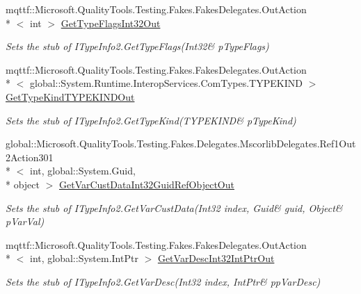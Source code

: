 \begin{DoxyCompactItemize}
mqttf\-::\-Microsoft.\-Quality\-Tools.\-Testing.\-Fakes.\-Fakes\-Delegates.\-Out\-Action\\*
$<$ int $>$ \hyperlink{class_system_1_1_runtime_1_1_interop_services_1_1_com_types_1_1_fakes_1_1_stub_i_type_info2_ac2f6fe3a6957288b95e38b7170801c12}{Get\-Type\-Flags\-Int32\-Out}
\begin{DoxyCompactList}\small\item\em Sets the stub of I\-Type\-Info2.\-Get\-Type\-Flags(Int32\& p\-Type\-Flags)\end{DoxyCompactList}\item 
mqttf\-::\-Microsoft.\-Quality\-Tools.\-Testing.\-Fakes.\-Fakes\-Delegates.\-Out\-Action\\*
$<$ global\-::\-System.\-Runtime.\-Interop\-Services.\-Com\-Types.\-T\-Y\-P\-E\-K\-I\-N\-D $>$ \hyperlink{class_system_1_1_runtime_1_1_interop_services_1_1_com_types_1_1_fakes_1_1_stub_i_type_info2_a641901054dca19f4d4f7ed13ba677e28}{Get\-Type\-Kind\-T\-Y\-P\-E\-K\-I\-N\-D\-Out}
\begin{DoxyCompactList}\small\item\em Sets the stub of I\-Type\-Info2.\-Get\-Type\-Kind(T\-Y\-P\-E\-K\-I\-N\-D\& p\-Type\-Kind)\end{DoxyCompactList}\item 
global\-::\-Microsoft.\-Quality\-Tools.\-Testing.\-Fakes.\-Delegates.\-Mscorlib\-Delegates.\-Ref1\-Out2\-Action301\\*
$<$ int, global\-::\-System.\-Guid, \\*
object $>$ \hyperlink{class_system_1_1_runtime_1_1_interop_services_1_1_com_types_1_1_fakes_1_1_stub_i_type_info2_a5bc85c9686d7564ef6a133789c8ff995}{Get\-Var\-Cust\-Data\-Int32\-Guid\-Ref\-Object\-Out}
\begin{DoxyCompactList}\small\item\em Sets the stub of I\-Type\-Info2.\-Get\-Var\-Cust\-Data(Int32 index, Guid\& guid, Object\& p\-Var\-Val)\end{DoxyCompactList}\item 
mqttf\-::\-Microsoft.\-Quality\-Tools.\-Testing.\-Fakes.\-Fakes\-Delegates.\-Out\-Action\\*
$<$ int, global\-::\-System.\-Int\-Ptr $>$ \hyperlink{class_system_1_1_runtime_1_1_interop_services_1_1_com_types_1_1_fakes_1_1_stub_i_type_info2_ae8e749d8d1234277eba7e584a8367eeb}{Get\-Var\-Desc\-Int32\-Int\-Ptr\-Out}
\begin{DoxyCompactList}\small\item\em Sets the stub of I\-Type\-Info2.\-Get\-Var\-Desc(Int32 index, Int\-Ptr\& pp\-Var\-Desc)\end{DoxyCompactList}\item 

\end{DoxyCompactItemize}
